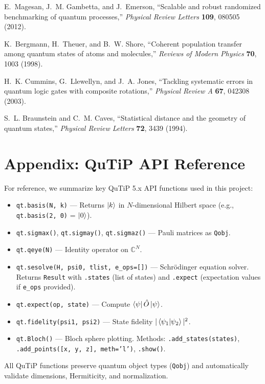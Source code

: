 \documentclass[11pt,a4paper]{article}
\theoremstyle{definition}
\theoremstyle{remark}
\newcommand{\CC}{\mathbb{C}}
\begin{document}
\begin{enumerate}[label={[\arabic*]}]
    \item E.~Magesan, J.~M. Gambetta, and J.~Emerson, ``Scalable and robust randomized benchmarking of quantum processes,'' \emph{Physical Review Letters} \textbf{109}, 080505 (2012).
    \item K.~Bergmann, H.~Theuer, and B.~W. Shore, ``Coherent population transfer among quantum states of atoms and molecules,'' \emph{Reviews of Modern Physics} \textbf{70}, 1003 (1998).
    \item H.~K. Cummins, G.~Llewellyn, and J.~A. Jones, ``Tackling systematic errors in quantum logic gates with composite rotations,'' \emph{Physical Review A} \textbf{67}, 042308 (2003).
    \item S.~L. Braunstein and C.~M. Caves, ``Statistical distance and the geometry of quantum states,'' \emph{Physical Review Letters} \textbf{72}, 3439 (1994).
\end{enumerate}

\appendix
\section{Appendix: QuTiP API Reference}
\label{app:qutip}

For reference, we summarize key QuTiP 5.x API functions used in this project:

\begin{itemize}
    \item \texttt{qt.basis(N, k)} — Returns $\ket{k}$ in $N$-dimensional Hilbert space (e.g., \texttt{qt.basis(2, 0)} = $\ket{0}$).
    \item \texttt{qt.sigmax()}, \texttt{qt.sigmay()}, \texttt{qt.sigmaz()} — Pauli matrices as \texttt{Qobj}.
    \item \texttt{qt.qeye(N)} — Identity operator on $\CC^N$.
    \item \texttt{qt.sesolve(H, psi0, tlist, e\_ops=[])} — Schrödinger equation solver. Returns \texttt{Result} with \texttt{.states} (list of states) and \texttt{.expect} (expectation values if \texttt{e\_ops} provided).
    \item \texttt{qt.expect(op, state)} — Compute $\bra{\psi} \hat{O} \ket{\psi}$.
    \item \texttt{qt.fidelity(psi1, psi2)} — State fidelity $|\braket{\psi_1}{\psi_2}|^2$.
    \item \texttt{qt.Bloch()} — Bloch sphere plotting. Methods: \texttt{.add\_states(states)}, \texttt{.add\_points([x, y, z], meth='l')}, \texttt{.show()}.
\end{itemize}

All QuTiP functions preserve quantum object types (\texttt{Qobj}) and automatically validate dimensions, Hermiticity, and normalization.
\end{document}
